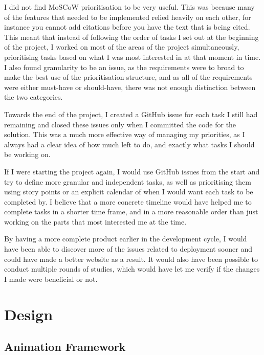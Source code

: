 \documentclass{l4proj}
\begin{document}
I did not find MoSCoW prioritisation to be very useful.  This was because many of the features that needed to be implemented relied heavily on each other, for instance you cannot add citations before you have the text that is being cited.  This meant that instead of following the order of tasks I set out at the beginning of the project, I worked on most of the areas of the project simultaneously, prioritising tasks based on what I was most interested in at that moment in time.  I also found granularity to be an issue, as the requirements were to broad to make the best use of the prioritisation structure, and as all of the requirements were either must-have or should-have, there was not enough distinction between the two categories.

Towards the end of the project, I created a GitHub issue for each task I still had remaining and closed these issues only when I committed the code for the solution.  This was a much more effective way of managing my priorities, as I always had a clear idea of how much left to do, and exactly what tasks I should be working on.

If I were starting the project again, I would use GitHub issues from the start and try to define more granular and independent tasks, as well as prioritising them using story points or an explicit calendar of when I would want each task to be completed by.  I believe that a more concrete timeline would have helped me to complete tasks in a shorter time frame, and in a more reasonable order than just working on the parts that most interested me at the time.

By having a more complete product earlier in the development cycle, I would have been able to discover more of the issues related to deployment sooner and could have made a better website as a result.  It would also have been possible to conduct multiple rounds of studies, which would have let me verify if the changes I made were beneficial or not.


\chapter{Design}

\section{Animation Framework}
\end{document}
